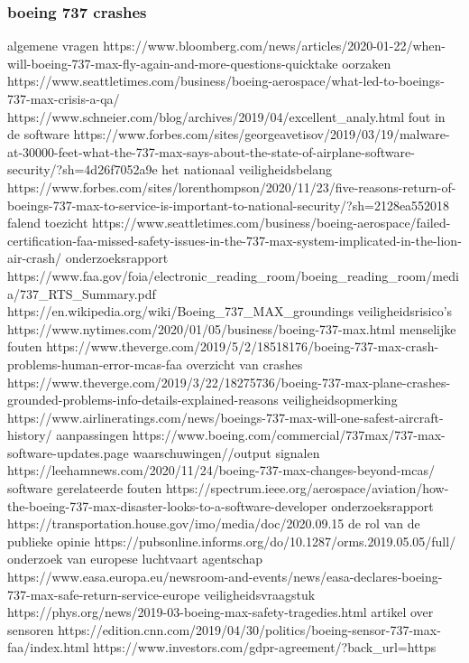 \subsubsection{boeing 737 crashes}


algemene vragen
https://www.bloomberg.com/news/articles/2020-01-22/when-will-boeing-737-max-fly-again-and-more-questions-quicktake
oorzaken
https://www.seattletimes.com/business/boeing-aerospace/what-led-to-boeings-737-max-crisis-a-qa/
https://www.schneier.com/blog/archives/2019/04/excellent_analy.html
fout in de software
https://www.forbes.com/sites/georgeavetisov/2019/03/19/malware-at-30000-feet-what-the-737-max-says-about-the-state-of-airplane-software-security/?sh=4d26f7052a9e
het nationaal veiligheidsbelang
https://www.forbes.com/sites/lorenthompson/2020/11/23/five-reasons-return-of-boeings-737-max-to-service-is-important-to-national-security/?sh=2128ea552018
falend toezicht
https://www.seattletimes.com/business/boeing-aerospace/failed-certification-faa-missed-safety-issues-in-the-737-max-system-implicated-in-the-lion-air-crash/
onderzoeksrapport
https://www.faa.gov/foia/electronic_reading_room/boeing_reading_room/media/737_RTS_Summary.pdf
https://en.wikipedia.org/wiki/Boeing_737_MAX_groundings
veiligheidsrisico's
https://www.nytimes.com/2020/01/05/business/boeing-737-max.html
menselijke fouten
https://www.theverge.com/2019/5/2/18518176/boeing-737-max-crash-problems-human-error-mcas-faa
overzicht van crashes
https://www.theverge.com/2019/3/22/18275736/boeing-737-max-plane-crashes-grounded-problems-info-details-explained-reasons
veiligheidsopmerking
https://www.airlineratings.com/news/boeings-737-max-will-one-safest-aircraft-history/
aanpassingen
https://www.boeing.com/commercial/737max/737-max-software-updates.page
waarschuwingen//output signalen
https://leehamnews.com/2020/11/24/boeing-737-max-changes-beyond-mcas/
software gerelateerde fouten
https://spectrum.ieee.org/aerospace/aviation/how-the-boeing-737-max-disaster-looks-to-a-software-developer
onderzoeksrapport
https://transportation.house.gov/imo/media/doc/2020.09.15%
de rol van de publieke opinie
https://pubsonline.informs.org/do/10.1287/orms.2019.05.05/full/
onderzoek van europese luchtvaart agentschap
https://www.easa.europa.eu/newsroom-and-events/news/easa-declares-boeing-737-max-safe-return-service-europe
veiligheidsvraagstuk
https://phys.org/news/2019-03-boeing-max-safety-tragedies.html
artikel over sensoren
https://edition.cnn.com/2019/04/30/politics/boeing-sensor-737-max-faa/index.html
https://www.investors.com/gdpr-agreement/?back_url=https%
